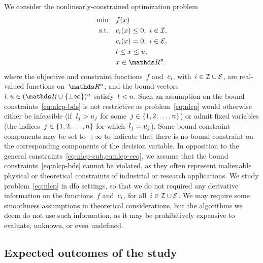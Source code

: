 We consider the nonlinearly-constrained optimization problem
\begin{subequations}
    \label{eq:nlcp}
    \begin{align}
        \min        & \quad \obj(x) \label{eq:nlcp-obj}\\
        \text{s.t.} & \quad \con{i}(x) \le 0, ~ i \in \iub, \label{eq:nlcp-cub}\\
                    & \quad \con{i}(x) = 0, ~ i \in \ieq, \label{eq:nlcp-ceq}\\
                    & \quad \xl \le x \le \xu, \label{eq:nlcp-bds}\\
                    & \quad x \in \R^n. \nonumber
    \end{align}
\end{subequations}
%
%
%
%
where the objective and constraint functions~$f$ and~$c_{i}$, with~$i \in \mathcal{I} \cup \mathcal{E}$, are real-valued functions on~$\R^n$, and the bound vectors~$\xl, \xu \in (\R \cup \set{\pm \infty})^n$ satisfy~$l < u$.
Such an assumption on the bound constraints~\cref{eq:nlcp-bds} is not restrictive as problem~\cref{eq:nlcp} would otherwise either be infeasible (if~$l_j > u_j$ for some~$j \in \{1, 2, \dots, n\}$) or admit fixed variables (the indices~$j \in \{1, 2, \dots, n\}$ for which~$l_j = u_j$).
Some bound constraint components may be set to~$\pm \infty$ to indicate that there is no bound constraint on the corresponding components of the decision variable.
In opposition to the general constraints~\cref{eq:nlcp-cub,eq:nlcp-ceq}, we assume that the bound constraints~\cref{eq:nlcp-bds} cannot be violated, as they often represent inalienable physical or theoretical constraints of industrial or research applications.
We study problem~\cref{eq:nlcp} in \gls{dfo} settings, so that we do not required any derivative information on the functions~$f$ and~$c_{i}$, for all~$i \in \mathcal{I} \cup \mathcal{E}$.
We may require some smoothness assumptions in theoretical considerations, but the algorithms we deem do not use such information, as it may be prohibitively expensive to evaluate, unknown, or even undefined.

\subsection{Expected outcomes of the study}

